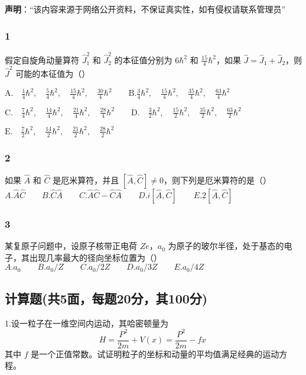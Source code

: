 
\textbf{声明}：“该内容来源于网络公开资料，不保证真实性，如有侵权请联系管理员”

\subsubsection{1}
假定自旋角动量算符 $\hat{J}_1^2$ 和 $\hat{J}_2^2$ 的本征值分别为 $6\hbar^2$ 和 $\frac{15}{4}\hbar^2$，如果 $\hat{J} = \hat{J}_1 + \hat{J}_2$，则 $\hat{J}^2$ 可能的本征值为（）

$\text{A.} \quad \frac{1}{4}\hbar^2, \quad \frac{5}{4}\hbar^2, \quad \frac{15}{4}\hbar^2, \quad \frac{30}{4}\hbar^2\qquad \text{B.}\frac{3}{4}\hbar^2, \quad \frac{15}{4}\hbar^2, \quad \frac{35}{4}\hbar^2, \quad \frac{63}{4}\hbar^2$

$\text{C.} \quad \frac{7}{4}\hbar^2, \quad \frac{14}{4}\hbar^2, \quad \frac{21}{4}\hbar^2, \quad \frac{28}{4}\hbar^2\qquad\text{D.} \quad \frac{3}{2}\hbar^2, \quad \frac{15}{2}\hbar^2, \quad \frac{35}{2}\hbar^2, \quad \frac{63}{2}\hbar^2$

$\text{E.} \quad \frac{7}{2}\hbar^2, \quad \frac{14}{2}\hbar^2, \quad \frac{21}{2}\hbar^2, \quad \frac{28}{2}\hbar^2$
\subsubsection{2}
如果 $\hat{A}$ 和 $\hat{C}$ 是厄米算符，并且 $[\hat{A}, \hat{C}] \neq 0$，则下列是厄米算符的是（）\\
$A. \hat{A}\hat{C}\qquad B. \hat{C}\hat{A}\qquad C. \hat{A}\hat{C} - \hat{C}\hat{A}\qquad D. i[\hat{A}, \hat{C}]\qquad E. 2[\hat{A}, \hat{C}]$
\subsubsection{3}
某复原子问题中，设原子核带正电荷 $Ze$，$a_0$ 为原子的玻尔半径，处于基态的电子，其出现几率最大的径向坐标位置为（）\\
$A. a_0\qquad B. a_0/Z \qquad C. a_0/2Z\qquad D. a_0/3Z\qquad E. a_0/4Z$
\subsection{计算题(共5面，每题20分，其100分)}
1.设一粒子在一维空间内运动，其哈密顿量为
$$H = \frac{P^2}{2m} + V(x) = \frac{P^2}{2m} - fx~$$
其中 $f$ 是一个正值常数。试证明粒子的坐标和动量的平均值满足经典的运动方程。